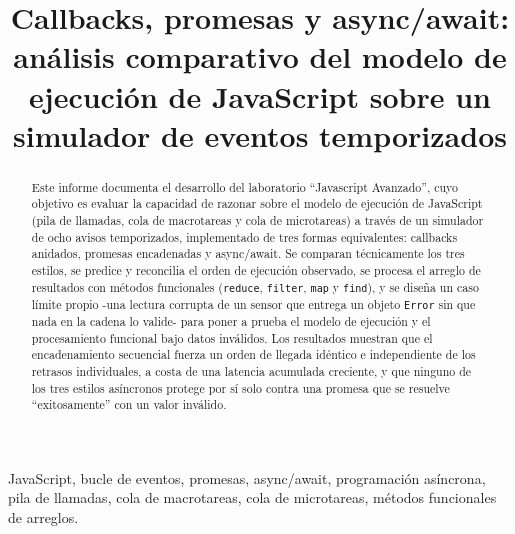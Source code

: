 \documentclass[conference,a4paper]{IEEEtran}
\begin{document}
\title{Callbacks, promesas y async/await: an\'alisis comparativo del modelo de ejecuci\'on de JavaScript sobre un simulador de eventos temporizados}

\author{
\and
{}
\and
{}
}

\maketitle

\begin{abstract}
Este informe documenta el desarrollo del laboratorio ``Javascript Avanzado'', cuyo objetivo es evaluar la capacidad de razonar sobre el modelo de ejecuci\'on de JavaScript (pila de llamadas, cola de macrotareas y cola de microtareas) a trav\'es de un simulador de ocho avisos temporizados, implementado de tres formas equivalentes: callbacks anidados, promesas encadenadas y async/await. Se comparan t\'ecnicamente los tres estilos, se predice y reconcilia el orden de ejecuci\'on observado, se procesa el arreglo de resultados con m\'etodos funcionales (\texttt{reduce}, \texttt{filter}, \texttt{map} y \texttt{find}), y se dise\~na un caso l\'imite propio -una lectura corrupta de un sensor que entrega un objeto \texttt{Error} sin que nada en la cadena lo valide- para poner a prueba el modelo de ejecuci\'on y el procesamiento funcional bajo datos inv\'alidos. Los resultados muestran que el encadenamiento secuencial fuerza un orden de llegada id\'entico e independiente de los retrasos individuales, a costa de una latencia acumulada creciente, y que ninguno de los tres estilos as\'incronos protege por s\'i solo contra una promesa que se resuelve ``exitosamente'' con un valor inv\'alido.
\end{abstract}

\begin{IEEEkeywords}
JavaScript, bucle de eventos, promesas, async/await, programaci\'on as\'incrona, pila de llamadas, cola de macrotareas, cola de microtareas, m\'etodos funcionales de arreglos.
\end{IEEEkeywords}
\end{document}
